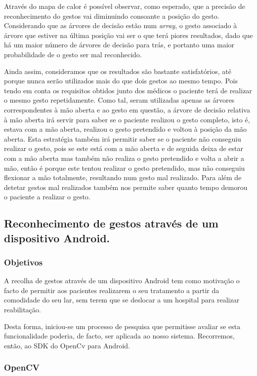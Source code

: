 \documentclass{TTUPhD}
\begin{document}
Através do mapa de calor é possível observar, como esperado, que a precisão de reconhecimento do gestos vai diminuindo consoante a posição do gesto. Considerando
que as árvores de decisão estão num \textit{array}, o gesto associado à árvore que estiver na última posição vai ser o que terá piores resultados, dado que há um maior
número de árvores de decisão para trás, e portanto uma maior probabilidade de o gesto ser mal reconhecido.

Ainda assim, consideramos que os resultados são bastante satisfatórios, até porque nunca serão utilizados mais do que dois gestos ao mesmo tempo. Pois tendo em conta
os requisitos obtidos junto dos médicos o paciente terá de realizar o mesmo gesto repetidamente. Como tal, seram utilizadas apenas as árvores correspondentes à mão aberta
e ao gesto em questão, a árvore de decisão relativa à mão aberta irá servir para saber se o paciente realizou o gesto completo, isto é, estava com a mão aberta,
realizou o gesto pretendido e voltou à posição da mão aberta. Esta estratégia também irá permitir saber se o paciente não conseguiu realizar o gesto, pois se este está
com a mão aberta e de seguida deixa de estar com a mão aberta mas também não realiza o gesto pretendido e volta a abrir a mão, então é porque este tentou realizar o gesto
pretendido, mas não conseguiu flexionar a mão totalmente, resultando num gesto mal realizado. Para além de detetar gestos mal realizados também nos permite saber quanto
tempo demorou o paciente a realizar o gesto.

\subsection{Reconhecimento de gestos através de um dispositivo Android.}

\subsubsection{Objetivos}

A recolha de gestos através de um dispositivo Android tem como motivação o facto de permitir aos pacientes realizarem o seu tratamento a partir da
comodidade do seu lar, sem terem que se deslocar a um hospital para realizar reabilitação.

Desta forma, iniciou-se um processo de pesquisa que permitisse avaliar se esta funcionalidade poderia, de facto, ser aplicada ao nosso sistema.
Recorremos, então, ao SDK do OpenCv para Android.

\subsubsection{OpenCV}
\end{document}
